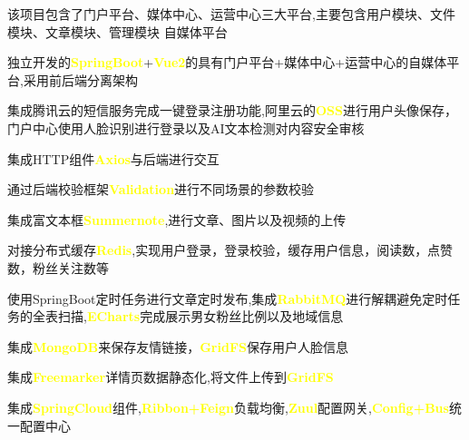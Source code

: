 \begin{cventries}
	\cventry
	{该项目包含了门户平台、媒体中心、运营中心三大平台,主要包含用户模块、文件模块、文章模块、管理模块} %
	{自媒体平台} %
	{} %
	{} %
	{
		\begin{cvitems} %
			\item {独立开发的\textcolor{yellow}{\textbf{SpringBoot}}+\textcolor{yellow}{\textbf{Vue2}}的具有门户平台+媒体中心+运营中心的自媒体平台,采用前后端分离架构}
			\item {集成腾讯云的短信服务完成一键登录注册功能,阿里云的\textcolor{yellow}{\textbf{OSS}}}进行用户头像保存，门户中心使用人脸识别进行登录以及AI文本检测对内容安全审核
			\item {集成HTTP组件\textcolor{yellow}{\textbf{Axios}}与后端进行交互}
			\item {通过后端校验框架\textcolor{yellow}{\textbf{Validation}}进行不同场景的参数校验}
			\item {集成富文本框\textcolor{yellow}{\textbf{Summernote}},进行文章、图片以及视频的上传}
			\item {对接分布式缓存\textcolor{yellow}{\textbf{Redis}},实现用户登录，登录校验，缓存用户信息，阅读数，点赞数，粉丝关注数等}
			\item {使用SpringBoot定时任务进行文章定时发布,集成\textcolor{yellow}{\textbf{RabbitMQ}}进行解耦避免定时任务的全表扫描,\textcolor{yellow}{\textbf{ECharts}}完成展示男女粉丝比例以及地域信息}	
			\item {集成\textcolor{yellow}{\textbf{MongoDB}}来保存友情链接，\textcolor{yellow}{\textbf{GridFS}}保存用户人脸信息}
			\item {集成\textcolor{yellow}{\textbf{Freemarker}}详情页数据静态化,将文件上传到\textcolor{yellow}{\textbf{GridFS}}}
			\item
			{集成\textcolor{yellow}{\textbf{SpringCloud}}组件,\textcolor{yellow}{\textbf{Ribbon+Feign}}负载均衡,\textcolor{yellow}{\textbf{Zuul}}配置网关,\textcolor{yellow}{\textbf{Config+Bus}}统一配置中心}
		\end{cvitems}
	} 
\end{cventries}
